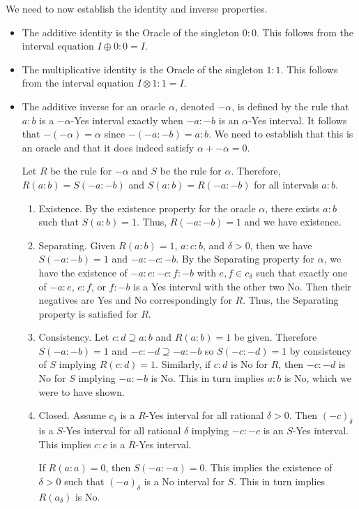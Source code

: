 \documentclass[12pt]{article}
\begin{document}
We need to now establish the identity and inverse properties. 

\begin{itemize}
    \item The additive identity is the Oracle of the singleton $0:0$. This follows from the interval equation $I \oplus 0:0 = I$.
    \item The multiplicative identity is the Oracle of the singleton $1:1$. This follows from the interval equation $I \otimes 1:1 = I$.
    \item The additive inverse for an oracle $\alpha$, denoted $-\alpha$, is defined by the rule that $a:b$ is a $-\alpha$-Yes interval exactly when $-a:-b$ is an $\alpha$-Yes interval.  It follows that $-(-\alpha) = \alpha$ since $-(-a:-b) = a:b$. We need to establish that this is an oracle and that it does indeed satisfy $\alpha + -\alpha = 0$. 
    
    Let $R$ be the rule for $-\alpha$ and $S$ be the rule for $\alpha$. Therefore, $R(a:b)=S(-a:-b)$ and $S(a:b) = R(-a:-b)$ for all intervals $a:b$.
    
    \begin{enumerate}
        \item Existence. By the existence property for the oracle $\alpha$, there exists $a:b$ such that $S(a:b)=1$. Thus, $R(-a:-b)=1$ and we have existence. 
        \item Separating. Given $R(a:b)=1$, $a:c:b$, and $\delta > 0$, then we have $S(-a:-b)=1$ and $-a:-c:-b$. By the Separating property for $\alpha$, we have the existence of $-a:e:-c:f:-b$ with $e, f \in c_\delta$ such that exactly one of $-a:e$, $e:f$, or $f:-b$ is a Yes interval with the other two No. Then their negatives are Yes and No correspondingly for $R$. Thus, the Separating property is satisfied for $R$.
        \item Consistency. Let $c:d \supseteq a:b$ and $R(a:b)=1$ be given. Therefore $S(-a:-b) = 1$ and $-c:-d \supseteq -a:-b$ so $S(-c:-d)=1$ by consistency of $S$ implying $R(c:d) = 1$. Similarly, if $c:d$ is No for $R$, then $-c:-d$ is No for $S$ implying $-a:-b$ is No. This in turn implies $a:b$ is No, which we were to have shown. 
        \item Closed. Assume $c_\delta$ is a $R$-Yes interval for all rational $\delta > 0$. Then $(-c)_\delta$ is a $S$-Yes interval for all rational $\delta$ implying $-c:-c$ is an $S$-Yes interval. This implies $c:c$ is a $R$-Yes interval. 

        If $R(a:a)=0$, then $S(-a:-a)=0$. This implies the existence of $\delta > 0$ such that $(-a)_\delta$ is a No interval for $S$. This in turn implies $R(a_\delta)$ is No.         
    \end{enumerate}
    

\end{itemize}
\end{document}
